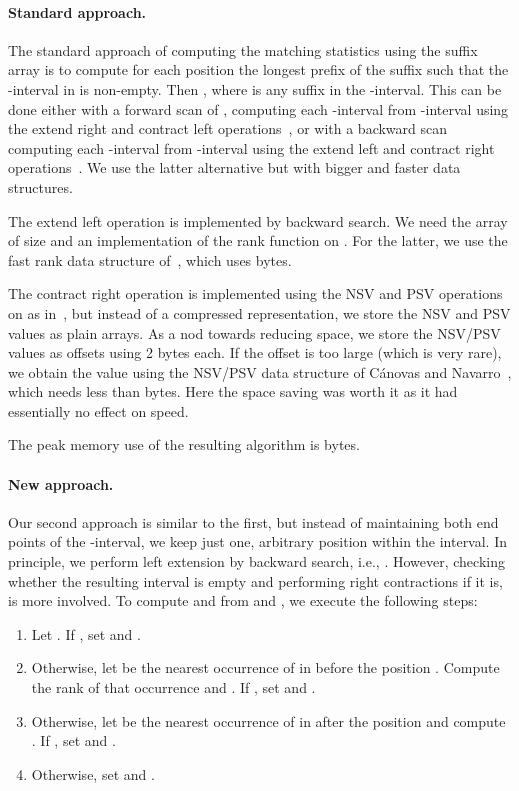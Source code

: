 \documentclass[runningheads]{llncs}
\begin{document}
{\paragraph{Standard  approach.}

The standard approach of computing the matching statistics using the
suffix array is to compute for each position  the longest prefix
 of the suffix  such that the
-interval in  is non-empty. Then
, where  is any suffix in the
-interval.  This can be done either with a forward scan of
, computing each -interval from -interval using
the extend right and contract left operations~\cite{ako2004}, or with
a backward scan computing each -interval from
-interval using the extend left and contract right
operations~\cite{og2011}.  We use the latter alternative but with
bigger and faster data structures.

The extend left operation is implemented by backward search. We need
the array  of size  and an implementation of the rank
function on . For the latter, we use the fast
rank data structure of~\cite{fgm2012}, which uses  bytes.

The contract right operation is implemented using the NSV and PSV
operations on  as in~\cite{og2011}, but instead of a
compressed representation, we store the NSV and PSV values as plain
arrays. As a nod towards reducing space, we store the NSV/PSV values
as offsets using 2 bytes each. If the offset is too large (which is
very rare), we obtain the value using the NSV/PSV data structure of
C{\'a}novas and Navarro~\cite{cn2010}, which needs less than  bytes.
Here the space saving was worth it as it had essentially no effect on
speed.

The peak memory use of the resulting algorithm is
 bytes.

\paragraph{New approach.}

Our second approach is similar to the first, but instead of
maintaining both end points of the -interval, we keep just one,
arbitrary position  within the interval. In principle, we perform
left extension by backward search, i.e.,
. However, checking whether
the resulting interval is empty and performing right contractions if
it is, is more involved. To compute  and  from
 and , we execute the following steps:
\begin{enumerate}
\item Let . If , set
   and . 
\item Otherwise, let  be the nearest occurrence of  in
   before the position . Compute the rank of that
  occurrence  and . If
  , set  and
  . 
\item Otherwise, let  be the nearest occurrence of  in
   after the position  and compute
  . If , set
   and .
\item Otherwise, set  and .
\end{enumerate}

}
\end{document}

